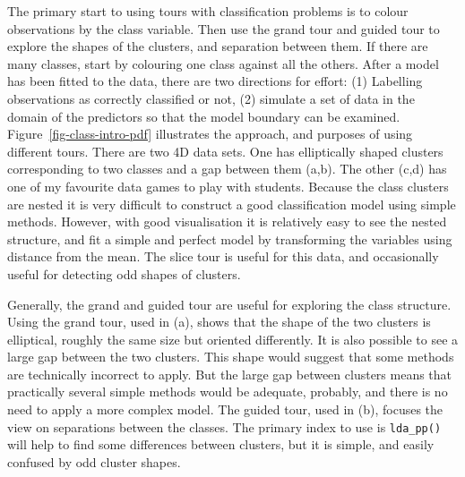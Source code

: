 \documentclass[
  letterpaper,
]{krantz}
\begin{document}
The primary start to using tours with classification problems is to
colour observations by the class variable. Then use the grand tour and
guided tour to explore the shapes of the clusters, and separation
between them. If there are many classes, start by colouring one class
against all the others. After a model has been fitted to the data, there
are two directions for effort: (1) Labelling observations as correctly
classified or not, (2) simulate a set of data in the domain of the
predictors so that the model boundary can be examined.
Figure~\ref{fig-class-intro-pdf} illustrates the approach, and purposes
of using different tours. There are two 4D data sets. One has
elliptically shaped clusters corresponding to two classes and a gap
between them (a,b). The other (c,d) has one of my favourite data games
to play with students. Because the class clusters are nested it is very
difficult to construct a good classification model using simple methods.
However, with good visualisation it is relatively easy to see the nested
structure, and fit a simple and perfect model by transforming the
variables using distance from the mean. The slice tour is useful for
this data, and occasionally useful for detecting odd shapes of clusters.

Generally, the grand and guided tour are useful for exploring the class
structure. Using the grand tour, used in (a), shows that the shape of
the two clusters is elliptical, roughly the same size but oriented
differently. It is also possible to see a large gap between the two
clusters. This shape would suggest that some methods are technically
incorrect to apply. But the large gap between clusters means that
practically several simple methods would be adequate, probably, and
there is no need to apply a more complex model. The guided tour, used in
(b), focuses the view on separations between the classes. The primary
index to use is \texttt{lda\_pp()} will help to find some differences
between clusters, but it is simple, and easily confused by odd cluster
shapes.
\end{document}
